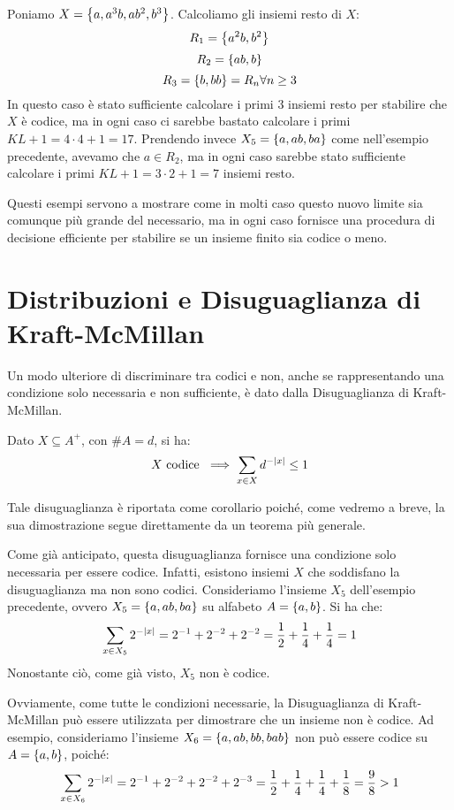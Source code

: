 \begin{example}
  Poniamo \(X = \set{a,a^3b,ab^2,b^3}\). Calcoliamo gli insiemi resto di \(X\):
  \[R_1 = \set{a^2b,b^2}\]
  \[R_2 = \set{ab,b}\]
  \[R_3 = \set{b,bb} = R_n \forall n \geq 3\]
  In questo caso è stato sufficiente calcolare i primi \(3\) insiemi resto per stabilire che \(X\) è codice, ma in ogni caso ci sarebbe bastato calcolare i primi \(KL+1 = 4\cdot 4 + 1 = 17\).
  Prendendo invece \(X_5 = \set{a,ab,ba}\) come nell'esempio precedente, avevamo che \(a \in R_2\), ma in ogni caso sarebbe stato sufficiente calcolare i primi \(KL+1 = 3\cdot 2 + 1 = 7\) insiemi resto.
\end{example}

Questi esempi servono a mostrare come in molti caso questo nuovo limite sia comunque più grande del necessario, ma in ogni caso fornisce una procedura di decisione efficiente per stabilire se un insieme finito sia codice o meno.

\section{Distribuzioni e Disuguaglianza di Kraft-McMillan}

Un modo ulteriore di discriminare tra codici e non, anche se rappresentando una condizione solo necessaria e non sufficiente, è dato dalla Disuguaglianza di Kraft-McMillan.
\begin{corollary}\label{cor:kraft-mcmillan_inequality}
  Dato \(X \subseteq A^+\), con \(\# A = d\), si ha:
    \[X \text{ codice } \implies \sum_{x \in X} d^{-\left|x\right|} \leq 1\]
\end{corollary}

Tale disuguaglianza è riportata come corollario poiché, come vedremo a breve, la sua dimostrazione segue direttamente da un teorema più generale.

\begin{example}
  Come già anticipato, questa disuguaglianza fornisce una condizione solo necessaria per essere codice. Infatti, esistono insiemi \(X\) che soddisfano la disuguaglianza ma non sono codici.
  Consideriamo l'insieme \(X_5\) dell'esempio precedente, ovvero \(X_5 = \set{a,ab,ba}\) su alfabeto \(A = \set{a,b}\).
  Si ha che:
  \[\sum_{x \in X_5} 2^{-\left|x\right|}= 2^{-1} + 2^{-2} + 2^{-2} = \frac{1}{2} + \frac{1}{4} + \frac{1}{4} = 1\]
  Nonostante ciò, come già visto, \(X_5\) non è codice.
  
  Ovviamente, come tutte le condizioni necessarie, la Disuguaglianza di Kraft-McMillan può essere utilizzata per dimostrare che un insieme non è codice.
  Ad esempio, consideriamo l'insieme \(X_6 = \set{a,ab,bb,bab}\) non può essere codice su \(A = \set{a,b}\), poiché:
  \[\sum_{x \in X_6} 2^{-\left|x\right|}= 2^{-1} + 2^{-2} + 2^{-2} + 2^{-3} = \frac{1}{2} + \frac{1}{4} + \frac{1}{4} + \frac{1}{8} = \frac{9}{8} > 1\]
\end{example}

